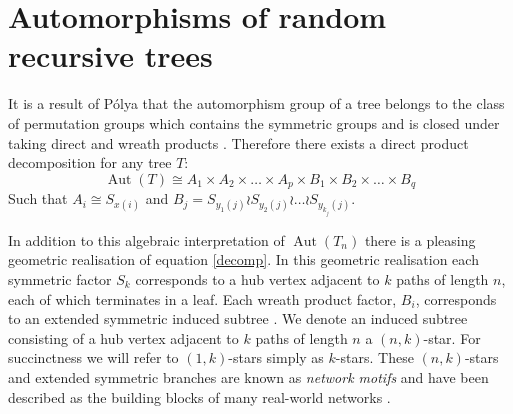 \documentclass[oneside]{book} %
\theoremstyle{definition}
\numberwithin{equation}{section}
\DeclareMathOperator{\Aut}{Aut} %
\begin{document}
\section{Automorphisms of random recursive trees}\label{sec:aorrt}
 It is a result of P\'{o}lya that the automorphism group of a tree belongs to the class of permutation groups which contains the symmetric groups and is closed under taking direct and wreath products \cite{biggs:1993}. Therefore there exists a direct product decomposition for any tree $T$:
 \begin{equation}\label{decomp}
  \Aut(T) \cong A_{1} \times A_{2} \times\dots\times A_{p} \times B_{1} \times B_{2} \times \dots \times B_{q}
 \end{equation}
Such that $A_{i} \cong S_{x(i)}$ and $B_{j} = S_{y_{1}(j)} \wr S_{y_{2}(j)} \wr \dots \wr S_{y_{k_{j}}(j)}$.

In addition to this algebraic interpretation of $\Aut(T_{n})$ there is a pleasing geometric realisation of equation \ref{decomp}.  In this geometric realisation each symmetric factor $S_k$ corresponds to a hub vertex adjacent to $k$ paths of length $n$, each of which terminates in a leaf. Each wreath product factor, $B_{i}$, corresponds to an extended symmetric induced subtree \cite{Ben}. We denote an induced subtree consisting of a hub vertex adjacent to $k$ paths of length $n$ a $(n,k)$-star.  For succinctness we will refer to $(1,k)$-stars simply as $k$-stars.  These $(n,k)$-stars and extended symmetric branches are known as \emph{network motifs} and have been described as the building blocks of many real-world networks \cite{milo}.
\end{document}
